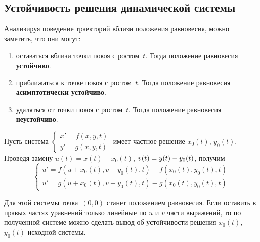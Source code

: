 \subsection{Устойчивость решения динамической системы}
Анализируя поведение траекторий вблизи положения равновесия, можно заметить, что они могут:
\begin{enumerate}
	\item оставаться вблизи точки покоя с ростом~$t$.
	Тогда положение равновесия \textbf{устойчиво}.

	\item приближаться к точке покоя с ростом~$t$.
	Тогда положение равновесия \textbf{асимптотически устойчиво}.
	
	\item удаляться от точки покоя с ростом~$t$.
	Тогда положение равновесия \textbf{неустойчиво}.
\end{enumerate}

Пусть система
$\begin{cases}
x' = f(x, y, t) \\
y' = g(x, y, t)
\end{cases}$
имеет частное решение $x_0(t)$, $y_0(t)$.
Проведя замену $u(t) = x(t) - x_0(t)$, $v(t) \opbr= y(t) - y_0(t)$, получим
\begin{equation*}
\begin{cases}
u' = f(u + x_0(t), v + y_0(t), t) - f(x_0(t), y_0(t), t) \\
u' = g(u + x_0(t), v + y_0(t), t) - g(x_0(t), y_0(t), t)
\end{cases}
\end{equation*}

Для этой системы точка~$(0, 0)$ станет положением равновесия.
Если оставить в правых частях уравнений только линейные по $u$ и $v$ части выражений, то по полученной системе можно сделать вывод об устойчивости решения $x_0(t)$, $y_0(t)$ исходной системы.